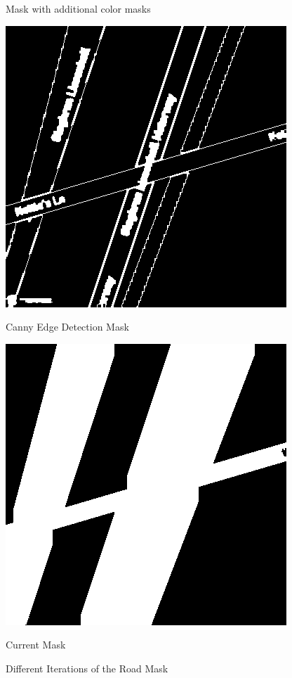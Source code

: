 \begin{figure}[htbp]
\begin{minipage}{0.45\textwidth}
        \caption*{Mask with additional color masks}
    \end{minipage}
    \hfill
    \begin{minipage}{0.45\textwidth}
        \centering
        \includegraphics[width=\textwidth]{images/canny_edge_mask.png}
        \caption*{Canny Edge Detection Mask}
    \end{minipage}
    \hfill
    \begin{minipage}{0.45\textwidth}
        \centering
        \includegraphics[width=\textwidth]{images/current_mask.png}
        \caption*{Current Mask}
    \end{minipage}
    \caption{Different Iterations of the Road Mask}
    \label{fig:Mask_Iterations}
\end{figure}

